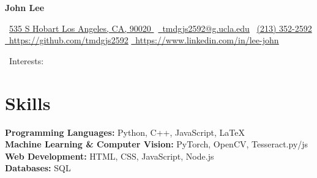 \documentclass[a4paper,10pt]{article}
\begin{document}
\begin{center}
    \textbf{\large John Lee}\\ 
\end{center}

\begin{center}
    {\raisebox{-0.2\height}\faHome\  \underline{535 S Hobart Los Angeles, CA, 90020 }}
     \ \href{mailto:tmdgjs2592@g.ucla.edu}{\raisebox{-0.2\height}\faEnvelope\  \underline{tmdgjs2592@g.ucla.edu}} 
     {\raisebox{-0.2\height}\faPhone\ \underline{(213) 352-2592}} \\
             \href{https://github.com/tmdgjs2592}{\raisebox{-0.2\height}\faGithub\ \underline{https://github.com/tmdgjs2592}}
             \href{https://www.linkedin.com/in/lee-john-9b9b20221/}{\raisebox{-0.2\height}\faLinkedin\ \underline{https://www.linkedin.com/in/lee-john}}
             
{\raisebox{-0.2\height}\faStar\ {Interests: }}
\end{center}

  
\section*{Skills}
\textbf{Programming Languages:} Python, C++, JavaScript, \LaTeX \\
\textbf{Machine Learning \& Computer Vision:} PyTorch, OpenCV, Tesseract.py/js \\
\textbf{Web Development:} HTML, CSS, JavaScript, Node.js \\
\textbf{Databases:} SQL \\
\end{document}
